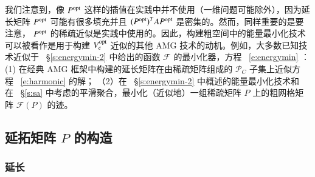 \documentclass[12pt]{acta_2011xz}
\begin{document}
我们注意到，像    $P^{\rm opt}$    这样的插值在实践中并不使用（一维问题可能除外），因为延长矩阵    $P^{\rm opt}$    可能有很多填充并且
   $(P^{\rm opt})^TAP^{\rm opt}$    是密集的。然而，同样重要的是要注意，   $P^{\rm opt}$    的稀疏近似是实践中使用的。因此，构建粗空间中的能量最小化技术可以被看作是用于构建    $V_c^{\rm opt}$    近似的其他 AMG 技术的动机。例如，大多数已知技术近似于~    \S       \ref{s:energymin-2}    中给出的函数    $\mathcal{F}$    的最小化器，方程~    \eqref{e:energymin}   ：(1) 在经典 AMG 框架中构建的延长矩阵在由稀疏矩阵组成的    $\mathcal{P}_C$    子集上近似方程~    \eqref{e:harmonic}    的解； （2）在~    \S       \ref{s:energymin-2}    中概述的能量最小化技术和在~    \S       \ref{s:sa}    中考虑的平滑聚合，最小化（近似地）一组稀疏矩阵    $P$    上的粗网格矩阵    $\mathcal{F}(P)$    的迹。  

   \subsection{延拓矩阵   $P$   的构造  }       \label{sec:classicP}     

   \subsubsection{延长  }     
\end{document}

